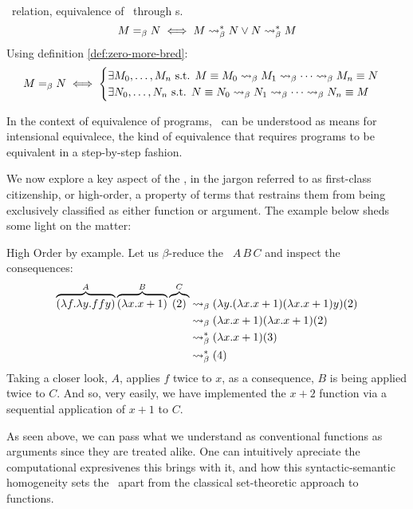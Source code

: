 \begin{definition} \bequiv \ relation, equivalence of \lterms \ through \bred s.
  \[
    M =_\beta N \iff M \mathrel{\leadsto}_\beta^* N \lor N \mathrel{\leadsto}_\beta^* M
  \]
 Using definition \ref{def:zero-more-bred}:
  \[
    M =_\beta N \iff
    \begin{cases}
      \exists M_0, \dots, M_n \text{ s.t. } M \equiv M_0 \mathrel{\leadsto}_\beta M_1 \mathrel{\leadsto}_\beta \cdots \mathrel{\leadsto}_\beta M_n \equiv N \\
      \exists N_0, \dots, N_n \text{ s.t. } N \equiv N_0 \mathrel{\leadsto}_\beta N_1 \mathrel{\leadsto}_\beta \cdots \mathrel{\leadsto}_\beta N_n \equiv M
    \end{cases}
  \]
\end{definition}
\begin{remark}
  In the context of equivalence of programs, \bequiv \ can be understood as means for intensional equivalece, the kind of equivalence that requires programs to be equivalent in a step-by-step fashion.
\end{remark}
We now explore a key aspect of the \lcalc, in the jargon referred to as first-class citizenship, or high-order, a property of terms that restrains them from being exclusively classified as either function or argument. The example below sheds some light on the matter:
\begin{example} High Order by example. Let us $\beta$-reduce the \lterm \ $ A \, B \, C $ and inspect the consequences:
  \label{ex:high-order-by-example}
\begin{align*}
  \overbrace { (\lambda f . \lambda y . f f y) }^{A} \overbrace{ (\lambda x . x + 1) }^{B} \overbrace{(2)}^{C}
  &\mathrel{\leadsto}_\beta (\lambda y .(\lambda x . x + 1) (\lambda x . x + 1)y)(2) \\
  &\mathrel{\leadsto}_\beta (\lambda x . x + 1)(\lambda x . x + 1)(2) \\
  &\mathrel{\leadsto}_\beta^* (\lambda x . x + 1) (3) \\
  &\mathrel{\leadsto}_\beta^* (4)
\end{align*}
Taking a closer look, $A$, applies $f$ twice to $x$, as a consequence, $B$ is being applied twice to $C$. And so, very easily, we have implemented the $ x + 2 $ function via a sequential application of $x + 1$ to $C$.
\end{example}
\begin{remark}
  As seen above, we can pass what we understand as conventional functions as arguments since they are treated alike.  One can intuitively apreciate the computational expresivenes this brings with it, and how this syntactic-semantic homogeneity sets the \lcalc \ apart from the classical set-theoretic approach to functions.
\end{remark}

